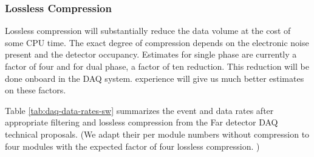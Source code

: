 \subsubsection{Lossless Compression}

Lossless compression will substantially reduce the data volume at the cost of some CPU time.  The exact degree of compression  depends on the electronic noise present and the detector occupancy.  Estimates for single phase are currently a factor of four and for dual phase, a factor of ten reduction.  This reduction will be done onboard in the DAQ system.   experience will give us much better estimates on these factors.



Table \ref{tab:daq-data-rates-sw} summarizes the event and data rates after appropriate filtering and lossless compression from the Far detector DAQ technical proposals.   (We adapt their per module numbers without compression to four modules with the expected factor of four lossless compression. )


